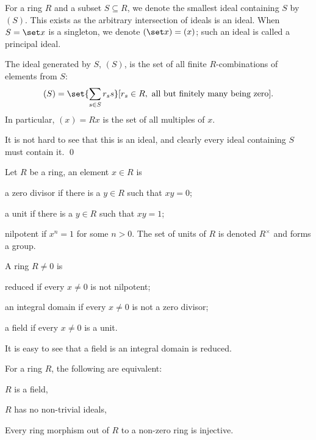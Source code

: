 \eprop

\bdefn

    For a ring $R$ and a subset $S\subseteq R$, we denote the smallest ideal containing $S$ by $(S)$.
    This exists as the arbitrary intersection of ideals is an ideal.
    When $S=\set x$ is a singleton, we denote $(\set x)=(x)$; such an ideal is called a {\emphcolor principal ideal}.

\edefn

\bprop

    The ideal generated by $S$, $(S)$, is the set of all finite $R$-combinations of elements from $S$:
    $$ (S) = \set{\sum_{s\in S}r_ss}[r_s\in R,\hbox{ all but finitely many being zero}] . $$
    In particular, $(x)=Rx$ is the set of all multiples of $x$.

\eprop

\bproof

    It is not hard to see that this is an ideal, and clearly every ideal containing $S$ must contain it.
    \qed

\eproof

\bdefn

    Let $R$ be a ring, an element $x\in R$ is
    \benum
        \item a {\emphcolor zero divisor} if there is a $y\in R$ such that $xy=0$;
        \item a {\emphcolor unit} if there is a $y\in R$ such that $xy=1$;
        \item {\emphcolor nilpotent} if $x^n=1$ for some $n>0$.
    \eenum
    The set of units of $R$ is denoted $R^\times$ and forms a group.

\edefn

\bdefn

    A ring $R\neq0$ is
    \benum
        \item {\emphcolor reduced} if every $x\neq0$ is not nilpotent;
        \item an {\emphcolor integral domain} if every $x\neq0$ is not a zero divisor;
        \item a {\emphcolor field} if every $x\neq0$ is a unit.
    \eenum

\edefn

It is easy to see that a field is an integral domain is reduced.

\bprop

    For a ring $R$, the following are equivalent:
    \benum
        \item $R$ is a field,
        \item $R$ has no non-trivial ideals,
        \item Every ring morphism out of $R$ to a non-zero ring is injective.
    \eenum

